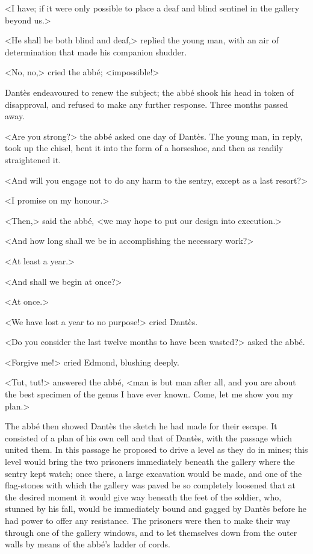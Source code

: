  <I have; if it were only possible to place a deaf and blind sentinel in the gallery beyond us.> 

 <He shall be both blind and deaf,> replied the young man, with an air of determination that made his companion shudder. 

 <No, no,> cried the abbé; <impossible!> 

 Dantès endeavoured to renew the subject; the abbé shook his head in token of disapproval, and refused to make any further response. Three months passed away. 

 <Are you strong?> the abbé asked one day of Dantès. The young man, in reply, took up the chisel, bent it into the form of a horseshoe, and then as readily straightened it. 

 <And will you engage not to do any harm to the sentry, except as a last resort?> 

 <I promise on my honour.> 

 <Then,> said the abbé, <we may hope to put our design into execution.> 

 <And how long shall we be in accomplishing the necessary work?> 

 <At least a year.> 

 <And shall we begin at once?> 

 <At once.> 

 <We have lost a year to no purpose!> cried Dantès. 

 <Do you consider the last twelve months to have been wasted?> asked the abbé. 

 <Forgive me!> cried Edmond, blushing deeply. 

 <Tut, tut!> answered the abbé, <man is but man after all, and you are about the best specimen of the genus I have ever known. Come, let me show you my plan.> 

 The abbé then showed Dantès the sketch he had made for their escape. It consisted of a plan of his own cell and that of Dantès, with the passage which united them. In this passage he proposed to drive a level as they do in mines; this level would bring the two prisoners immediately beneath the gallery where the sentry kept watch; once there, a large excavation would be made, and one of the flag-stones with which the gallery was paved be so completely loosened that at the desired moment it would give way beneath the feet of the soldier, who, stunned by his fall, would be immediately bound and gagged by Dantès before he had power to offer any resistance. The prisoners were then to make their way through one of the gallery windows, and to let themselves down from the outer walls by means of the abbé's ladder of cords. 

